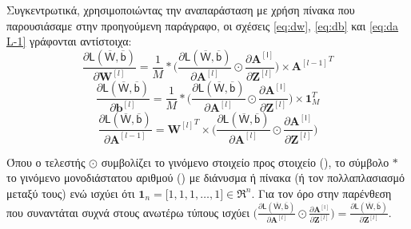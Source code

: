 Συγκεντρωτικά, χρησιμοποιώντας την αναπαράσταση με χρήση πίνακα που παρουσιάσαμε στην προηγούμενη παράγραφο, οι σχέσεις \ref{eq:dw}, \ref{eq:db} και \ref{eq:da L-1} γράφονται αντίστοιχα\cite{youtubeANG}:
\begin{equation}\label{eq:_bw}
  \frac{\partial \mathsf{L(\overline{W},\overline{b})}}{{\partial \boldsymbol{W}^{[l]}}} = \frac{1}{M} \ast \big(\frac{\partial \mathsf{L(\overline{W},\overline{b})}}{\partial \boldsymbol{A}^{[l]}} \odot \frac{\partial \mathsf{{\boldsymbol{A}^{[l]}}}}{\partial \boldsymbol{Z}^{[l]}} \big) \times {\boldsymbol{A}^{[l-1]}}^T
\end{equation}
\begin{equation}\label{eq:_bb}
  \frac{\partial \mathsf{L(\overline{W},\overline{b})}}{\partial \boldsymbol{b}^{[l]}} = \frac{1}{M} \ast \big(\frac{\partial \mathsf{L(\overline{W},\overline{b})}}{\partial \boldsymbol{A}^{[l]}} \odot \frac{\partial \mathsf{{\boldsymbol{A}^{[l]}}}}{\partial \boldsymbol{Z}^{[l]}} \big) \times \boldsymbol{1}_M^T
\end{equation}
\begin{equation}\label{eq:_ba}
  \frac{\partial \mathsf{L(\overline{W},\overline{b})}}{{\partial \boldsymbol{A}^{[l-1]}}} =  {\boldsymbol{W}^{[l]}}^T\times \big(\frac{\partial \mathsf{L(\overline{W},\overline{b})}}{\partial \boldsymbol{A}^{[l]}} \odot \frac{\partial \mathsf{{\boldsymbol{A}^{[l]}}}}{\partial \boldsymbol{Z}^{[l]}} \big) 
\end{equation}

Όπου ο τελεστής $\odot$ συμβολίζει το γινόμενο στοιχείο προς στοιχείο (), το σύμβολο $\ast$ το γινόμενο μονοδιάστατου αριθμού () με διάνυσμα ή πίνακα (ή τον πολλαπλασιασμό  μεταξύ τους) ενώ ισχύει ότι $\boldsymbol{1}_n = \big[1, 1, 1, \dots, 1\big] \in \Re^n$. Για τον όρο στην παρένθεση που συναντάται συχνά στους ανωτέρω τύπους ισχύει $\big(\frac{\partial \mathsf{L(\overline{W},\overline{b})}}{\partial \boldsymbol{A}^{[l]}} \odot \frac{\partial \mathsf{{\boldsymbol{A}^{[l]}}}}{\partial \boldsymbol{Z}^{[l]}} \big) = \frac{\partial \mathsf{L(\overline{W},\overline{b})}}{{\partial \boldsymbol{Z}^{[l]}}}$. \par

